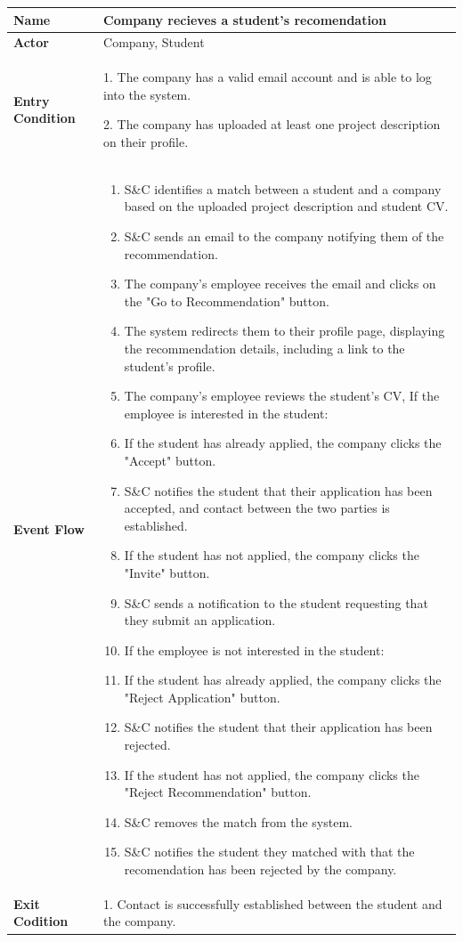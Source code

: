 \begin{longtable}{|p{}|p{}|}
\hline
\textbf{Name} &  Company recieves a student's recomendation\\
\hline
\textbf{Actor} &  Company, Student\\
\hline
\textbf{Entry Condition} &  
1. The company has a valid email account and is able to log into the system.

2. The company has uploaded at least one project description on their profile.\\
\hline
\textbf{Event Flow} &  
\begin{enumerate}
\item S\&C identifies a match between a student and a company based on the uploaded project description and student CV.	
\item S\&C sends an email to the company notifying them of the recommendation.
\item  The company’s employee receives the email and clicks on the "Go to Recommendation" button.
\item  The system redirects them to their profile page, displaying the recommendation details, including a link to the student's profile.
\item The company’s employee reviews the student’s CV, If the employee is interested in the student:
\item  If the student has already applied, the company clicks the "Accept" button.
\item S\&C notifies the student that their application has been accepted, and contact between the two parties is established.
\item  If the student has not applied, the company clicks the "Invite" button.
\item S\&C sends a notification to the student requesting that they submit an application.
\item If the employee is not interested in the student:
\item If the student has already applied, the company clicks the "Reject Application" button.
\item S\&C notifies the student that their application has been rejected.
\item  If the student has not applied, the company clicks the "Reject Recommendation" button.
\item S\&C removes the match from the system.
\item S\&C notifies the student they matched with that the recomendation has been rejected by the company. 
\end{enumerate}\\
\hline
\textbf{Exit Codition} &  
1. Contact is successfully established between the student and the company.


\end{longtable}
